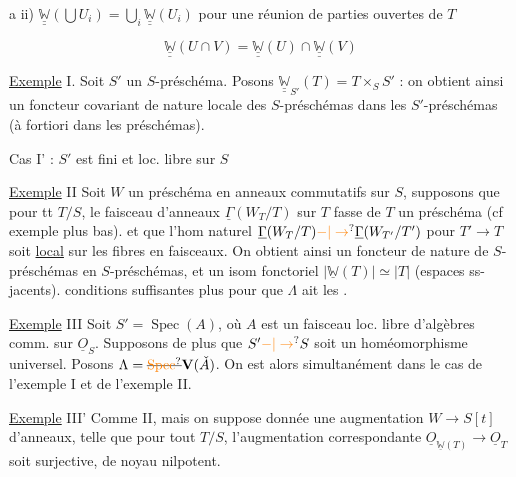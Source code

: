 a ii) $\underline{\underline{\mathbb W}}(\bigcup U_i)=\bigcup_i\underline{\underline{\mathbb W}}(U_i)$ pour une réunion  de parties ouvertes de $T$

\[
\underline{\underline{\mathbb W}}(U\cap V)=\underline{\underline{\mathbb W}}(U)\cap\underline{\underline{\mathbb W}}(V)\tag*{a iii)}
\]

\uline{Exemple} I. Soit $S'$ un $S$-préschéma. Posons $\underline{\underline{\mathbb W}}_{S'}(T)=T\times_S S'$ : on obtient ainsi  un foncteur covariant de nature locale des $S$-préschémas dans les $S'$-préschémas (à fortiori dans les préschémas).

Cas I' : $S'$ est fini et loc. libre sur $S$

\uline{Exemple} II Soit $W$ un  préschéma en anneaux commutatifs sur $S$, supposons que pour tt $T/S$, le faisceau d'anneaux $\underline\Gamma(W_T/T)$ sur $T$ fasse de $T$ un préschéma (cf exemple plus bas). 
 et que l'hom naturel $\underline\Gamma(W_T/T)\unsure{-|\to}\underline\Gamma(W_{T'}/T')$ pour $T'\to T$  soit \uline{local} sur les fibres en faisceaux. On obtient ainsi un foncteur  de nature  de $S$-préschémas en $S$-préschémas, et un isom fonctoriel $|\underline{\mathbb W}(T)|\simeq|T|$ (espaces ss-jacents).   conditions suffisantes plus  pour que $\Lambda$ ait les .

\uline{Exemple} III Soit $S'=\operatorname{Spec}(A)$, où $A$ est un faisceau loc. libre d'algèbres comm. sur $\underline O_S$. Supposons de plus que $S'\unsure{-|\to}S$ soit un homéomorphisme universel. Posons $\Lambda=\deleted{\unsure{\operatorname{Spec}}}\mathbf V(\check A)$. On est alors simultanément dans le cas de l'exemple I et de l'exemple II.

\uline{Exemple} III' Comme II, mais on suppose donnée une augmentation $W\longrightarrow S[t]$ d'anneaux, telle que pour tout $T/S$, l'augmentation correspondante $\underline O_{\underline{\mathbb W}(T)}\longrightarrow\underline O_T$ soit surjective, de noyau nilpotent.

